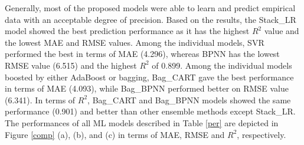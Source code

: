 \documentclass[11pt]{article}
\begin{document}
	
	Generally, most of the proposed models were able to learn and predict empirical data with an acceptable degree of precision. Based on the results, the Stack\_LR model showed the best prediction performance as it has the highest $R^2$ value and the lowest MAE and RMSE values. Among the individual models, SVR performed the best in terms of MAE (4.296), whereas BPNN has the lowest RMSE value (6.515) and the highest $R^2$ of 0.899. Among the individual models boosted by either AdaBoost or bagging, Bag\_CART gave the best performance in terms of MAE (4.093), while Bag\_BPNN performed better on RMSE value (6.341). In terms of $R^2$, Bag\_CART and Bag\_BPNN models showed the same performance (0.901) and better than other ensemble methods except Stack\_LR. The performances of all ML models described in Table \ref{per} are depicted in Figure \ref{comp} (a), (b), and (c) in terms of MAE, RMSE and $R^2$, respectively.
	
	
	
\end{document}
